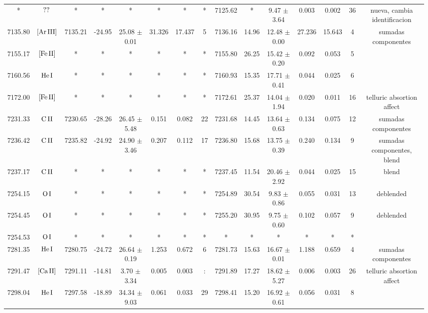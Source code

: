 \documentclass{article}
\begin{document}
\begin{table*}
\begin{adjustbox}{width=\textwidth}
\begin{tabular}{ccccccccccccccc}
* & $\mbox{??}\thinspace \mbox{}$ & * & * & * & * & * & * & 7125.62 & * & 9.47 $\pm$ 3.64 & 0.003 & 0.002 & 36 &  nueva, cambia identificacion \\
7135.80 & $\mbox{[Ar}\thinspace \mbox{III]}$ & 7135.21 & -24.95 & 25.08 $\pm$ 0.01 & 31.326 & 17.437 & 5 & 7136.16 & 14.96 & 12.48 $\pm$ 0.00 & 27.236 & 15.643 & 4 &  sumadas componentes \\
7155.17 & $\mbox{[Fe}\thinspace \mbox{II]}$ & * & * & * & * & * & * & 7155.80 & 26.25 & 15.42 $\pm$ 0.20 & 0.092 & 0.053 & 5 &  \\
7160.56 & $\mbox{He}\thinspace \mbox{I}$ & * & * & * & * & * & * & 7160.93 & 15.35 & 17.71 $\pm$ 0.41 & 0.044 & 0.025 & 6 &  \\
7172.00 & $\mbox{[Fe}\thinspace \mbox{II]}$ & * & * & * & * & * & * & 7172.61 & 25.37 & 14.04 $\pm$ 1.94 & 0.020 & 0.011 & 16 &  telluric absortion affect \\
7231.33 & $\mbox{C}\thinspace \mbox{II}$ & 7230.65 & -28.26 & 26.45 $\pm$ 5.48 & 0.151 & 0.082 & 22 & 7231.68 & 14.45 & 13.64 $\pm$ 0.63 & 0.134 & 0.075 & 12 &  sumadas componentes \\
7236.42 & $\mbox{C}\thinspace \mbox{II}$ & 7235.82 & -24.92 & 24.90 $\pm$ 3.46 & 0.207 & 0.112 & 17 & 7236.80 & 15.68 & 13.75 $\pm$ 0.39 & 0.240 & 0.134 & 9 &  sumadas componentes, blend \\
7237.17 & $\mbox{C}\thinspace \mbox{II}$ & * & * & * & * & * & * & 7237.45 & 11.54 & 20.46 $\pm$ 2.92 & 0.044 & 0.025 & 15 &  blend \\
7254.15 & $\mbox{O}\thinspace \mbox{I}$ & * & * & * & * & * & * & 7254.89 & 30.54 & 9.83 $\pm$ 0.86 & 0.055 & 0.031 & 13 &  deblended \\
7254.45 & $\mbox{O}\thinspace \mbox{I}$ & * & * & * & * & * & * & 7255.20 & 30.95 & 9.75 $\pm$ 0.60 & 0.102 & 0.057 & 9 &  deblended \\
7254.53 & $\mbox{O}\thinspace \mbox{I}$ & * & * & * & * & * & * & * & * & * & * & * & * &  \\
7281.35 & $\mbox{He}\thinspace \mbox{I}$ & 7280.75 & -24.72 & 26.64 $\pm$ 0.19 & 1.253 & 0.672 & 6 & 7281.73 & 15.63 & 16.67 $\pm$ 0.01 & 1.188 & 0.659 & 4 &  sumadas componentes \\
7291.47 & $\mbox{[Ca}\thinspace \mbox{II]}$ & 7291.11 & -14.81 & 3.70 $\pm$ 3.34 & 0.005 & 0.003 & : & 7291.89 & 17.27 & 18.62 $\pm$ 5.27 & 0.006 & 0.003 & 26 &  telluric absortion affect \\
7298.04 & $\mbox{He}\thinspace \mbox{I}$ & 7297.58 & -18.89 & 34.34 $\pm$ 9.03 & 0.061 & 0.033 & 29 & 7298.41 & 15.20 & 16.92 $\pm$ 0.61 & 0.056 & 0.031 & 8 &  \\

\end{tabular}
\end{adjustbox}
\end{table*}
\end{document}
